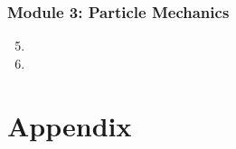 \documentclass[fleqn,titlepage]{book}
\numberwithin{equation}{section}
\theoremstyle{plain}
\theoremstyle{definition}
\theoremstyle{remark}
\begin{document}
\section{Module 3: Particle Mechanics}
\begin{enumerate}[label=\bfseries  \arabic*.]\setcounter{enumi}{4}
\item 
\item 
\end{enumerate}

\part{Appendix}
\end{document}
